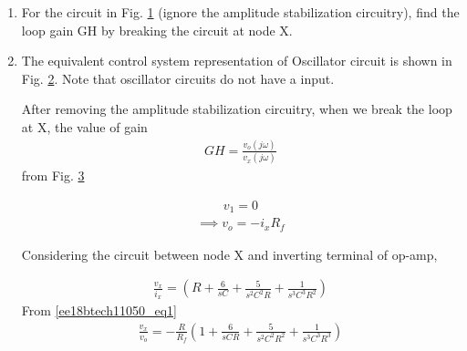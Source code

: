 \begin{enumerate}[label=\thesection.\arabic*.,ref=\thesection.\theenumi]
\renewcommand{\thefigure}{\theenumi.\arabic{figure}}

\item For the circuit in Fig. \ref{fig:ee18btech11050_f1} (ignore the amplitude stabilization circuitry), find the loop gain GH by breaking the circuit at node X. 

\begin{figure}[!ht]
	\begin{center}
		\resizebox{\columnwidth}{!}{}
	\end{center}
\caption{}
\label{fig:ee18btech11050_f1}
\end{figure}

\item \solution
The equivalent control system representation of Oscillator circuit is shown in Fig. \ref{fig:ee18btech11050_f4}. Note that oscillator circuits do not have a input.
\begin{figure}[!ht]
	\begin{center}
		\resizebox{\columnwidth}{!}{}
	\end{center}
\caption{}
\label{fig:ee18btech11050_f4}
\end{figure}
After removing the amplitude stabilization circuitry, when we break the loop at X, the value of gain
\begin{align}
    GH = \frac{v_o(j\omega)}{v_x(j\omega)}
\end{align}
from Fig. \ref{fig:ee18btech11050_f2}
\begin{figure}[!ht]
	\begin{center}
		\resizebox{\columnwidth}{!}{}
	\end{center}
\caption{}
\label{fig:ee18btech11050_f2}
\end{figure}
\begin{align}
    v_1 = 0
\end{align}
\begin{align}
    \implies v_o = -i_xR_f
    \label{ee18btech11050_eq1}
\end{align}

Considering the circuit between node X and inverting terminal of op-amp,

\begin{align}
    \frac{v_x}{i_x} = (R+\frac{6}{sC}+\frac{5}{s^2C^2R}+\frac{1}{s^3C^3R^2})
\end{align}
From \eqref{ee18btech11050_eq1}
\begin{align}
    \frac{v_x}{v_o} = -\frac{R}{R_f}(1+\frac{6}{sCR}+\frac{5}{s^2C^2R^2}+\frac{1}{s^3C^3R^3})
\end{align}


\end{enumerate}
